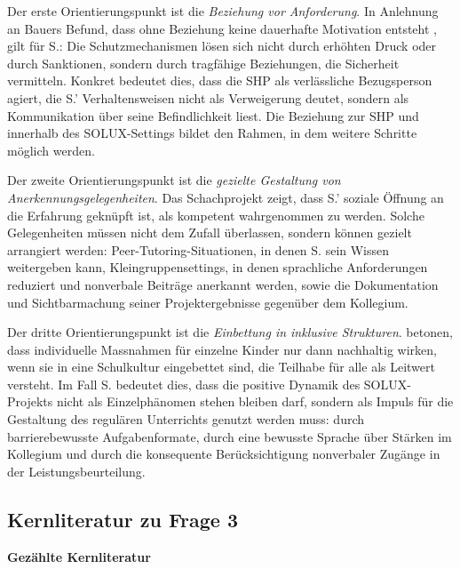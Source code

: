 \documentclass[ngerman, a4paper]{article}
\begin{document}
Der erste Orientierungspunkt ist die \textit{Beziehung vor Anforderung}. In
Anlehnung an Bauers Befund, dass ohne Beziehung keine dauerhafte Motivation
entsteht \parencite[S.\,91]{grossrieder2010anerkennung}, gilt für S.:
Die Schutzmechanismen lösen sich nicht durch erhöhten Druck oder durch Sanktionen,
sondern durch tragfähige Beziehungen, die Sicherheit vermitteln. Konkret bedeutet
dies, dass die SHP als verlässliche Bezugsperson agiert, die S.' Verhaltensweisen
nicht als Verweigerung deutet, sondern als Kommunikation über seine Befindlichkeit
liest. Die Beziehung zur SHP und innerhalb des SOLUX-Settings bildet den Rahmen,
in dem weitere Schritte möglich werden.

Der zweite Orientierungspunkt ist die \textit{gezielte Gestaltung von
  Anerkennungsgelegenheiten}. Das Schachprojekt zeigt, dass S.' soziale Öffnung an
die Erfahrung geknüpft ist, als kompetent wahrgenommen zu werden. Solche
Gelegenheiten müssen nicht dem Zufall überlassen, sondern können gezielt arrangiert
werden: Peer-Tutoring-Situationen, in denen S. sein Wissen weitergeben kann,
Kleingruppensettings, in denen sprachliche Anforderungen reduziert und nonverbale
Beiträge anerkannt werden, sowie die Dokumentation und Sichtbarmachung seiner
Projektergebnisse gegenüber dem Kollegium.

Der dritte Orientierungspunkt ist die \textit{Einbettung in inklusive Strukturen}.
\textcite[S.\,101--125]{booth2019index} betonen,
dass individuelle Massnahmen für einzelne Kinder nur dann
nachhaltig wirken, wenn sie in eine Schulkultur eingebettet sind, die Teilhabe für
alle als Leitwert versteht. Im Fall S. bedeutet dies, dass die positive Dynamik des
SOLUX-Projekts nicht als Einzelphänomen stehen bleiben darf, sondern als Impuls für
die Gestaltung des regulären Unterrichts genutzt werden muss: durch barrierebewusste
Aufgabenformate, durch eine bewusste Sprache über Stärken im Kollegium und durch die
konsequente Berücksichtigung nonverbaler Zugänge in der Leistungsbeurteilung.

\subsection{Kernliteratur zu Frage 3}

\textbf{Gezählte Kernliteratur}
\end{document}
